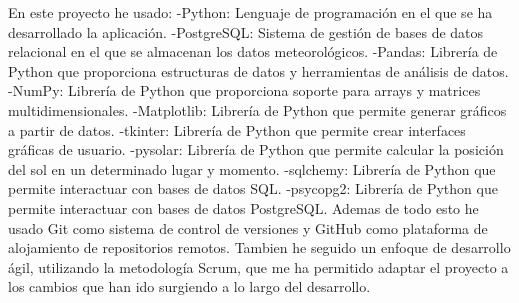
En este proyecto he usado:\newline\newline
-Python: Lenguaje de programación en el que se ha desarrollado la aplicación.\newline
-PostgreSQL: Sistema de gestión de bases de datos relacional en el que se almacenan los datos meteorológicos.\newline
-Pandas: Librería de Python que proporciona estructuras de datos y herramientas de análisis de datos.\newline
-NumPy: Librería de Python que proporciona soporte para arrays y matrices multidimensionales.\newline
-Matplotlib: Librería de Python que permite generar gráficos a partir de datos.\newline
-tkinter: Librería de Python que permite crear interfaces gráficas de usuario.\newline
-pysolar: Librería de Python que permite calcular la posición del sol en un determinado lugar y momento.\newline
-sqlchemy: Librería de Python que permite interactuar con bases de datos SQL.\newline
-psycopg2: Librería de Python que permite interactuar con bases de datos PostgreSQL.\newline
Ademas de todo esto he usado Git como sistema de control de versiones y GitHub como plataforma de alojamiento de repositorios remotos.\newline
Tambien he seguido un enfoque de desarrollo ágil, utilizando la metodología Scrum, que me ha permitido adaptar el proyecto a los cambios que han ido surgiendo a lo largo del desarrollo.\newline
